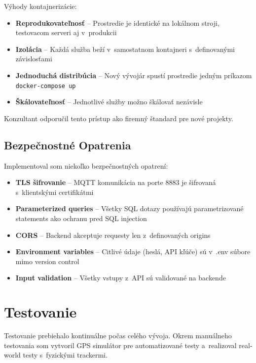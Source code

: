 Výhody kontajnerizácie:

\begin{itemize}
    \item \textbf{Reprodukovateľnosť} -- Prostredie je identické na lokálnom stroji, testovacom serveri aj v~produkcii
    \item \textbf{Izolácia} -- Každá služba beží v~samostatnom kontajneri s~definovanými závislosťami
    \item \textbf{Jednoduchá distribúcia} -- Nový vývojár spustí prostredie jedným príkazom \texttt{docker-compose up}
    \item \textbf{Škálovateľnosť} -- Jednotlivé služby možno škálovať nezávisle
\end{itemize}

Konzultant odporučil tento prístup ako firemný štandard pre nové projekty.

\subsection{Bezpečnostné Opatrenia}
\label{sec:Bezpecnost}

Implementoval som niekoľko bezpečnostných opatrení:

\begin{itemize}
    \item \textbf{TLS šifrovanie} -- MQTT komunikácia na porte 8883 je šifrovaná s~klientskými certifikátmi
    \item \textbf{Parameterized queries} -- Všetky SQL dotazy používajú parametrizované statements ako ochranu pred SQL injection
    \item \textbf{CORS} -- Backend akceptuje requesty len z~definovaných origins
    \item \textbf{Environment variables} -- Citlivé údaje (heslá, API kľúče) sú v~.env súbore mimo version control
    \item \textbf{Input validation} -- Všetky vstupy z~API sú validované na backende
\end{itemize}


\section{Testovanie}
\label{sec:Testovani}

Testovanie prebiehalo kontinuálne počas celého vývoja. Okrem manuálneho testovania som vytvoril GPS simulátor pre automatizované testy a~realizoval real-world testy s~fyzickými trackermi.


